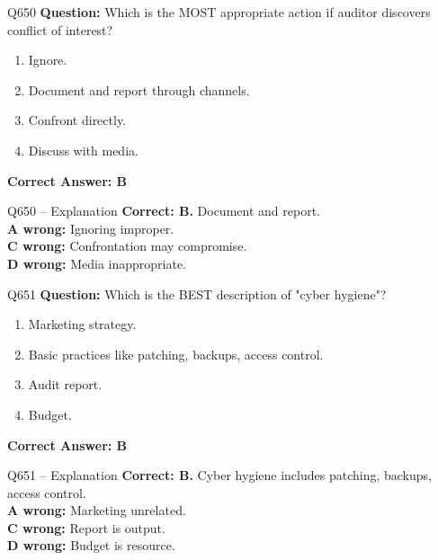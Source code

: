\documentclass[aspectratio=169,10pt]{beamer}
\begin{document}
	\begin{frame}[t]{Q650}
		\small
		\textbf{Question:} Which is the MOST appropriate action if auditor discovers conflict of interest?
		\begin{enumerate}[label=\Alph*.,itemsep=1pt,topsep=2pt]
			\item Ignore.
			\item Document and report through channels.
			\item Confront directly.
			\item Discuss with media.
		\end{enumerate}
		\vspace{4pt}
		\textbf{Correct Answer: B}
	\end{frame}
	
	\begin{frame}[t]{Q650 -- Explanation}
		\small
		\textbf{Correct: B.} Document and report. \\[4pt]
		\textbf{A wrong:} Ignoring improper. \\[2pt]
		\textbf{C wrong:} Confrontation may compromise. \\[2pt]
		\textbf{D wrong:} Media inappropriate.
	\end{frame}
	
	\begin{frame}[t]{Q651}
		\small
		\textbf{Question:} Which is the BEST description of "cyber hygiene"?
		\begin{enumerate}[label=\Alph*.,itemsep=1pt,topsep=2pt]
			\item Marketing strategy.
			\item Basic practices like patching, backups, access control.
			\item Audit report.
			\item Budget.
		\end{enumerate}
		\vspace{4pt}
		\textbf{Correct Answer: B}
	\end{frame}
	
	\begin{frame}[t]{Q651 -- Explanation}
		\small
		\textbf{Correct: B.} Cyber hygiene includes patching, backups, access control. \\[4pt]
		\textbf{A wrong:} Marketing unrelated. \\[2pt]
		\textbf{C wrong:} Report is output. \\[2pt]
		\textbf{D wrong:} Budget is resource.
	\end{frame}
	
\end{document}
